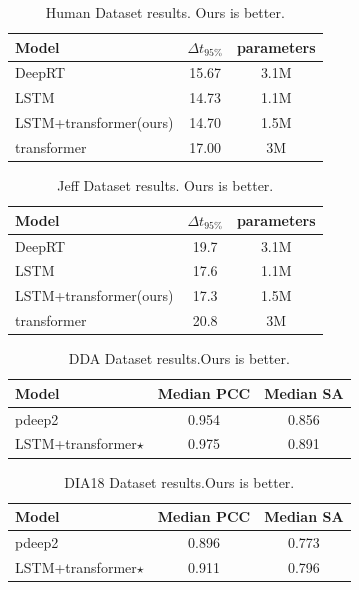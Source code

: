 \documentclass[final]{cvpr}
\begin{document}
\begin{table}
   \begin{center}
   \begin{tabular}{|l|c|c|}
   \hline
   Model & $\Delta$$t_{95\%}$ & parameters \\
   \hline\hline
   DeepRT & 15.67 & 3.1M \\
   LSTM & 14.73 & 1.1M \\
   LSTM+transformer(ours) & 14.70 & 1.5M \\
   transformer & 17.00 & 3M \\
   \hline
   \end{tabular}
   \end{center}
   \caption{Human Dataset results.   Ours is better.}
   \label{table:Human}
   \end{table}
   
   
   \begin{table}
      \begin{center}
      \begin{tabular}{|l|c|c|}
      \hline
      Model & $\Delta$$t_{95\%}$ & parameters \\
      \hline\hline
      DeepRT & 19.7 & 3.1M \\
      LSTM & 17.6 & 1.1M \\
      LSTM+transformer(ours) & 17.3 & 1.5M \\
      transformer & 20.8 & 3M \\
      \hline
      \end{tabular}
      \end{center}
      \caption{Jeff Dataset results.   Ours is better.}
      \label{table:Jeff}
      \end{table}

\begin{table}
   \begin{center}
   \begin{tabular}{|l|c|c|}
   \hline
   Model & Median PCC & Median SA \\
   \hline\hline
   pdeep2 & 0.954 & 0.856 \\
   LSTM+transformer$\star$ & 0.975 & 0.891 \\
   \hline
   \end{tabular}
   \end{center}
   \caption{DDA Dataset results.Ours is better.}
   \label{table:DDA}
   \end{table}

\begin{table}
   \begin{center}
   \begin{tabular}{|l|c|c|}
   \hline
   Model & Median PCC & Median SA \\
   \hline\hline
   pdeep2 & 0.896 & 0.773 \\
   LSTM+transformer$\star$ & 0.911 & 0.796 \\
   \hline
   \end{tabular}
   \end{center}
   \caption{DIA18 Dataset results.Ours is better.}
   \label{table:DIA18}
\end{table}
\end{document}
